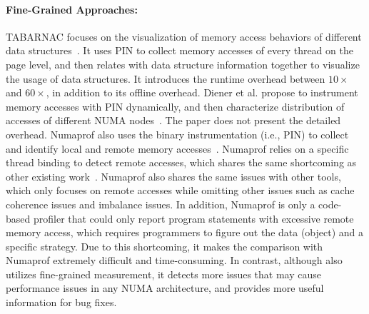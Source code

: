 \paragraph{Fine-Grained Approaches:} 
TABARNAC focuses on the visualization of memory access behaviors of different data structures~\cite{TABARNAC}. It uses PIN to collect memory accesses of every thread on the page level, and then relates with data structure information together to visualize the usage of data structures. It introduces the runtime overhead between $10\times$ and $60\times$, in addition to its offline overhead. Diener et al. propose to instrument memory accesses with PIN dynamically, and then characterize distribution of accesses of different NUMA nodes~\cite{diener2015characterizing}. The paper does not present the detailed overhead. 
Numaprof also uses the binary instrumentation  (i.e., PIN) to collect and identify local and remote memory accesses~\cite{valat:2018:numaprof}. 
Numaprof relies on a specific thread binding to detect remote accesses, which shares the same shortcoming as other existing work~\cite{XuNuma, 7847070}. 
Numaprof also shares the same issues with other tools, which only focuses on remote accesses while omitting other issues such as cache coherence issues and imbalance issues. 
In addition, Numaprof is only a code-based profiler that could only report program statements with excessive remote memory access, which requires programmers to figure out the data (object) and a specific strategy. Due to this shortcoming, it makes the comparison with Numaprof extremely difficult and time-consuming. 
In contrast, although \NP{} also utilizes fine-grained measurement, it detects more issues that may cause performance issues in any NUMA architecture, and provides more useful information for bug fixes.    




